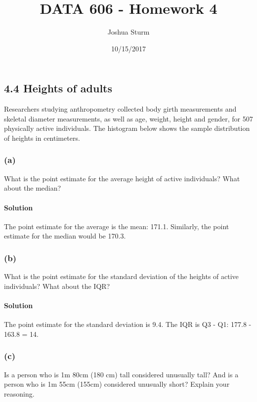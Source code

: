 \documentclass[]{article}
\title{DATA 606 - Homework 4}
\author{Joshua Sturm}
\date{10/15/2017}
\let\oldparagraph\paragraph
\renewcommand{\paragraph}[1]{\oldparagraph{#1}\mbox{}}
\begin{document}
\maketitle

{
\setcounter{tocdepth}{2}
\tableofcontents
}
\subsection{4.4 Heights of adults}\label{heights-of-adults}

Researchers studying anthropometry collected body girth measurements and
skeletal diameter measurements, as well as age, weight, height and
gender, for 507 physically active individuals. The histogram below shows
the sample distribution of heights in centimeters.

\subsubsection{(a)}\label{a}

What is the point estimate for the average height of active individuals?
What about the median?

\paragraph{Solution}\label{solution}

The point estimate for the average is the mean: 171.1. Similarly, the
point estimate for the median would be 170.3.

\subsubsection{(b)}\label{b}

What is the point estimate for the standard deviation of the heights of
active individuals? What about the IQR?

\paragraph{Solution}\label{solution-1}

The point estimate for the standard deviation is 9.4. The IQR is Q3 -
Q1: 177.8 - 163.8 = 14.

\subsubsection{(c)}\label{c}

Is a person who is 1m 80cm (180 cm) tall considered unusually tall? And
is a person who is 1m 55cm (155cm) considered unusually short? Explain
your reasoning.
\end{document}
